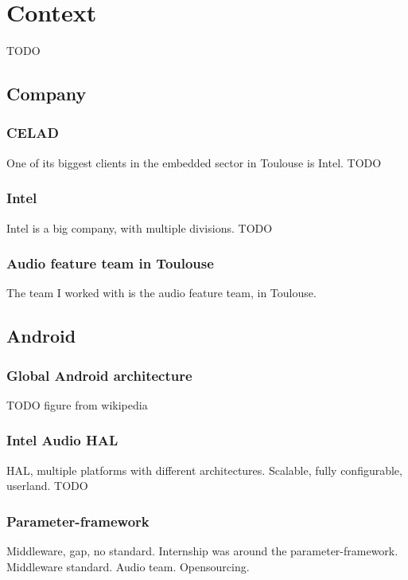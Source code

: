 \chapter{Context}\label{chap:context}

\begin{sectionIntro}
    TODO
\end{sectionIntro}

\section{Company}

\subsection{CELAD}
One of its biggest clients in the embedded sector in Toulouse is Intel.
TODO

\subsection{Intel}
Intel is a big company, with multiple divisions.
TODO

\subsection{Audio feature team in Toulouse}
The team I worked with is the audio feature team, in Toulouse.

\section{Android}

\subsection{Global Android architecture}
TODO figure from wikipedia

\subsection{Intel Audio HAL}
HAL, multiple platforms with different architectures.
Scalable, fully configurable, userland.
TODO

\subsection{Parameter-framework}
\label{sec:parameter-framework}
Middleware, gap, no standard.
Internship was around the parameter-framework. Middleware standard. Audio team. Opensourcing.

